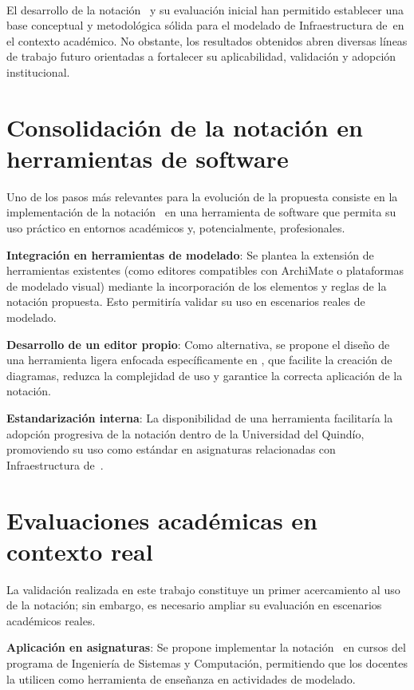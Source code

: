 \label{cap:trabajos-futuros}
\mbox{}\\

El desarrollo de la notación \NDITI~y su evaluación inicial han permitido establecer una base conceptual y metodológica sólida para el modelado de Infraestructura de~\TI en el contexto académico. No obstante, los resultados obtenidos abren diversas líneas de trabajo futuro orientadas a fortalecer su aplicabilidad, validación y adopción institucional.

\section{Consolidación de la notación en herramientas de software}
\noindent

Uno de los pasos más relevantes para la evolución de la propuesta consiste en la implementación de la notación \NDITI~en una herramienta de software que permita su uso práctico en entornos académicos y, potencialmente, profesionales.

\textbf{Integración en herramientas de modelado}: Se plantea la extensión de herramientas existentes (como editores compatibles con ArchiMate o plataformas de modelado visual) mediante la incorporación de los elementos y reglas de la notación propuesta. Esto permitiría validar su uso en escenarios reales de modelado.

\textbf{Desarrollo de un editor propio}: Como alternativa, se propone el diseño de una herramienta ligera enfocada específicamente en \NDITI, que facilite la creación de diagramas, reduzca la complejidad de uso y garantice la correcta aplicación de la notación.

\textbf{Estandarización interna}: La disponibilidad de una herramienta facilitaría la adopción progresiva de la notación dentro de la Universidad del Quindío, promoviendo su uso como estándar en asignaturas relacionadas con Infraestructura de~\TI.

\section{Evaluaciones académicas en contexto real}
\noindent

La validación realizada en este trabajo constituye un primer acercamiento al uso de la notación; sin embargo, es necesario ampliar su evaluación en escenarios académicos reales.

\textbf{Aplicación en asignaturas}: Se propone implementar la notación \NDITI~en cursos del programa de Ingeniería de Sistemas y Computación, permitiendo que los docentes la utilicen como herramienta de enseñanza en actividades de modelado.

